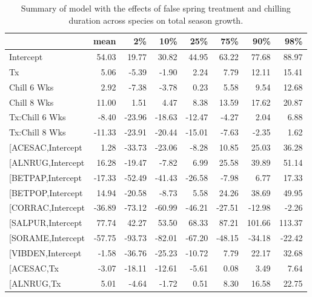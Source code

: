 \documentclass{article}\usepackage[]{graphicx}\usepackage[]{color}
\makeatletter
\newenvironment{kframe}{%
 \def\at@end@of@kframe{}%
 \ifinner\ifhmode%
  \def\at@end@of@kframe{\end{minipage}}%
  \begin{minipage}{\columnwidth}%
 \fi\fi%
 \def\FrameCommand##1{\hskip\@totalleftmargin \hskip-\fboxsep
 \colorbox{shadecolor}{##1}\hskip-\fboxsep
     \hskip-\linewidth \hskip-\@totalleftmargin \hskip\columnwidth}%
 \MakeFramed {\advance\hsize-\width
   \@totalleftmargin\z@ \linewidth\hsize
   \@setminipage}}%
 {\par\unskip\endMakeFramed%
 \at@end@of@kframe}
\makeatother
\begin{document}
\newpage
\begin{kframe}


{\ttfamily\noindent\bfseries\color{errorcolor}{\#\# Error in gsub("{}["{}, "{}"{}, modoutput\$term): invalid regular expression '[', reason 'Missing ']''}}\end{kframe}%
\begin{longtable}{lrrrrrrr}
\caption{Summary of model with the effects of false spring treatment and chilling duration across species on total season growth.} \\ 
  \hline
 & mean & 2\% & 10\% & 25\% & 75\% & 90\% & 98\% \\ 
  \hline \endhead  \hline
Intercept & 54.03 & 19.77 & 30.82 & 44.95 & 63.22 & 77.68 & 88.97 \\ 
  Tx & 5.06 & -5.39 & -1.90 & 2.24 & 7.79 & 12.11 & 15.41 \\ 
  Chill 6 Wks & 2.92 & -7.38 & -3.78 & 0.23 & 5.58 & 9.54 & 12.68 \\ 
  Chill 8 Wks & 11.00 & 1.51 & 4.47 & 8.38 & 13.59 & 17.62 & 20.87 \\ 
  Tx:Chill 6 Wks & -8.40 & -23.96 & -18.63 & -12.47 & -4.27 & 2.04 & 6.88 \\ 
  Tx:Chill 8 Wks & -11.33 & -23.91 & -20.44 & -15.01 & -7.63 & -2.35 & 1.62 \\ 
  [ACESAC,Intercept & 1.28 & -33.73 & -23.06 & -8.28 & 10.85 & 25.03 & 36.28 \\ 
  [ALNRUG,Intercept & 16.28 & -19.47 & -7.82 & 6.99 & 25.58 & 39.89 & 51.14 \\ 
  [BETPAP,Intercept & -17.33 & -52.49 & -41.43 & -26.58 & -7.98 & 6.77 & 17.33 \\ 
  [BETPOP,Intercept & 14.94 & -20.58 & -8.73 & 5.58 & 24.26 & 38.69 & 49.95 \\ 
  [CORRAC,Intercept & -36.89 & -73.12 & -60.99 & -46.21 & -27.51 & -12.98 & -2.26 \\ 
  [SALPUR,Intercept & 77.74 & 42.27 & 53.50 & 68.33 & 87.21 & 101.66 & 113.37 \\ 
  [SORAME,Intercept & -57.75 & -93.73 & -82.01 & -67.20 & -48.15 & -34.18 & -22.42 \\ 
  [VIBDEN,Intercept & -1.58 & -36.76 & -25.23 & -10.72 & 7.79 & 22.17 & 32.68 \\ 
  [ACESAC,Tx & -3.07 & -18.11 & -12.61 & -5.61 & 0.08 & 3.49 & 7.64 \\ 
  [ALNRUG,Tx & 5.01 & -4.64 & -1.72 & 0.51 & 8.30 & 16.58 & 22.75 \\ 

\end{longtable}
\end{document}
